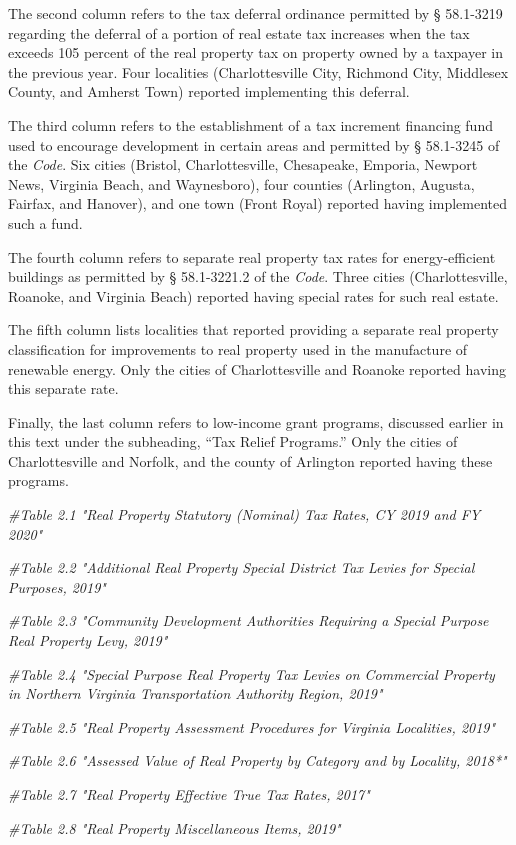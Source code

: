 \documentclass[
]{book}
\newenvironment{Shaded}{\begin{snugshade}}{\end{snugshade}}
\newcommand{\CommentTok}[1]{\textcolor[rgb]{0.56,0.35,0.01}{\textit{#1}}}
\begin{document}
The second column refers to the tax deferral ordinance permitted by § 58.1-3219 regarding the deferral of a portion of real estate tax increases when the tax exceeds 105 percent of the real property tax on property owned by a taxpayer in the previous year. Four localities (Charlottesville City, Richmond City, Middlesex County, and Amherst Town) reported implementing this deferral.

The third column refers to the establishment of a tax increment financing fund used to encourage development in certain areas and permitted by § 58.1-3245 of the \emph{Code}. Six cities (Bristol, Charlottesville, Chesapeake, Emporia, Newport News, Virginia Beach, and Waynesboro), four counties (Arlington, Augusta, Fairfax, and Hanover), and one town (Front Royal) reported having implemented such a fund.

The fourth column refers to separate real property tax rates for energy-efficient buildings as permitted by § 58.1-3221.2 of the \emph{Code}. Three cities (Charlottesville, Roanoke, and Virginia Beach) reported having special rates for such real estate.

The fifth column lists localities that reported providing a separate real property classification for improvements to real property used in the manufacture of renewable energy. Only the cities of Charlottesville and Roanoke reported having this separate rate.

Finally, the last column refers to low-income grant programs, discussed earlier in this text under the subheading, ``Tax Relief Programs.'' Only the cities of Charlottesville and Norfolk, and the county of Arlington reported having these programs.

\begin{Shaded}
\begin{Highlighting}[]
\CommentTok{\#Table 2.1 "Real Property Statutory (Nominal) Tax Rates, CY 2019 and FY 2020"}


\CommentTok{\#Table 2.2 "Additional Real Property Special District Tax Levies for Special Purposes, 2019"}


\CommentTok{\#Table 2.3 "Community Development Authorities Requiring a Special Purpose Real Property Levy, 2019" }


\CommentTok{\#Table 2.4 "Special Purpose Real Property Tax Levies on Commercial Property in Northern Virginia Transportation Authority Region, 2019" }


\CommentTok{\#Table 2.5 "Real Property Assessment Procedures for Virginia Localities, 2019" }


\CommentTok{\#Table 2.6 "Assessed Value of Real Property by Category and by Locality, 2018*"}


\CommentTok{\#Table 2.7 "Real Property Effective True Tax Rates, 2017"}


\CommentTok{\#Table 2.8 "Real Property Miscellaneous Items, 2019"}
\end{Highlighting}
\end{Shaded}
\end{document}
